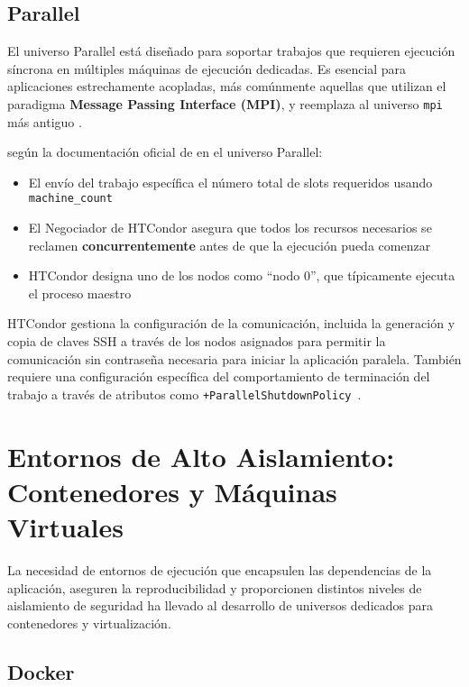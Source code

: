 \subsection{Parallel}

El universo Parallel está diseñado para soportar trabajos que requieren ejecución síncrona en múltiples máquinas de ejecución dedicadas. Es esencial para aplicaciones estrechamente acopladas, más comúnmente aquellas que utilizan el paradigma \textbf{Message Passing Interface (MPI)}, y reemplaza al universo \texttt{mpi} más antiguo \citep{HTCondor-env-services}.


según la documentación oficial de \citep{HTCondor-env-services} en el universo Parallel:

\begin{itemize}
	\item El envío del trabajo específica el número total de slots requeridos usando \texttt{machine\_count}
	\item El Negociador de HTCondor asegura que todos los recursos necesarios se reclamen \textbf{concurrentemente} antes de que la ejecución pueda comenzar
	\item HTCondor designa uno de los nodos como ``nodo 0'', que típicamente ejecuta el proceso maestro
\end{itemize}

HTCondor gestiona la configuración de la comunicación, incluida la generación y copia de claves SSH a través de los nodos asignados para permitir la comunicación sin contraseña necesaria para iniciar la aplicación paralela. También requiere una configuración específica del comportamiento de terminación del trabajo a través de atributos como \texttt{+ParallelShutdownPolicy}~\citep{HTCondor-env-services}.




\section{Entornos de Alto Aislamiento: Contenedores y Máquinas Virtuales}

La necesidad de entornos de ejecución que encapsulen las dependencias de la aplicación, aseguren la reproducibilidad y proporcionen distintos niveles de aislamiento de seguridad ha llevado al desarrollo de universos dedicados para contenedores y virtualización.

\subsection{Docker}

